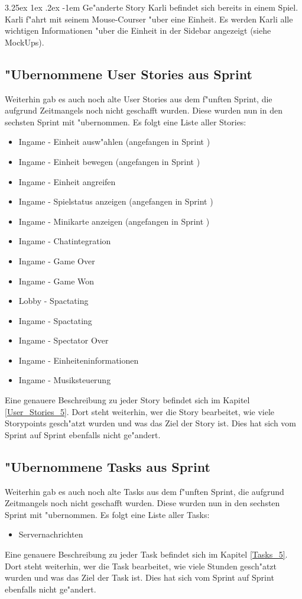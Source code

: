 \documentclass[12pt, titlepage]{scrartcl}
\makeatletter
\newcommand{\RN}[1]{%
	\textup{\uppercase\expandafter{\romannumeral#1}}%
}
\renewcommand\paragraph{\@startsection{paragraph}{5}{\z@}%
  {3.25ex \@plus1ex \@minus.2ex}%
  {-1em}%
  {\normalfont\normalsize\bfseries}}
\makeatother
\begin{document}
   				\paragraph{Ge"anderte Story}
   					Karli befindet sich bereits in einem Spiel. Karli f"ahrt mit seinem Mouse-Courser "uber eine Einheit. Es werden Karli alle wichtigen Informationen "uber die Einheit in der Sidebar angezeigt (siehe MockUps).
   		\subsection{"Ubernommene User Stories aus Sprint \RN{5}}
   			Weiterhin gab es auch noch alte User Stories aus dem f"unften Sprint, die aufgrund Zeitmangels noch nicht geschafft wurden. Diese wurden nun in den sechsten Sprint mit "ubernommen. Es folgt eine Liste aller Stories:
   			\begin{itemize}
   				\item Ingame - Einheit ausw"ahlen (angefangen in Sprint \RN{5})
   				\item Ingame - Einheit bewegen (angefangen in Sprint \RN{5})
   				\item Ingame - Einheit angreifen
   				\item Ingame - Spielstatus anzeigen (angefangen in Sprint \RN{5})
   				\item Ingame - Minikarte anzeigen (angefangen in Sprint \RN{5})
   				\item Ingame - Chatintegration
   				\item Ingame - Game Over
   				\item Ingame - Game Won
   				\item Lobby - Spactating
   				\item Ingame - Spactating
   				\item Ingame - Spectator Over
   				\item Ingame - Einheiteninformationen
   				\item Ingame - Musiksteuerung
   			\end{itemize}
   			Eine genauere Beschreibung zu jeder Story befindet sich im Kapitel \ref{User_Stories_5}. Dort steht weiterhin, wer die Story bearbeitet, wie viele Storypoints gesch"atzt wurden und was das Ziel der Story ist. Dies hat sich vom Sprint \RN{5} auf Sprint \RN{6} ebenfalls nicht ge"andert.
    	\subsection{"Ubernommene Tasks aus Sprint \RN{5}}
    		Weiterhin gab es auch noch alte Tasks aus dem f"unften Sprint, die aufgrund Zeitmangels noch nicht geschafft wurden. Diese wurden nun in den sechsten Sprint mit "ubernommen. Es folgt eine Liste aller Tasks:
	    	\begin{itemize}
	    		\item Servernachrichten
	    	\end{itemize}
    		Eine genauere Beschreibung zu jeder Task befindet sich im Kapitel \ref{Tasks_5}. Dort steht weiterhin, wer die Task bearbeitet, wie viele Stunden gesch"atzt wurden und was das Ziel der Task ist. Dies hat sich vom Sprint \RN{5} auf Sprint \RN{6} ebenfalls nicht ge"andert.
\end{document}
